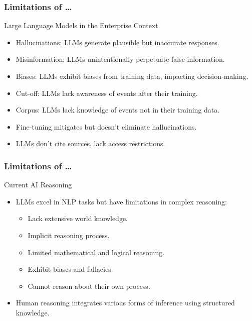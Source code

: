 


\begin{frame}[fragile]\frametitle{Limitations of \ldots}
Large Language Models in the Enterprise Context

\begin{itemize}
\item Hallucinations: LLMs generate plausible but inaccurate responses.
\item Misinformation: LLMs unintentionally perpetuate false information.
\item Biases: LLMs exhibit biases from training data, impacting decision-making.
\item Cut-off: LLMs lack awareness of events after their training.
\item Corpus: LLMs lack knowledge of events not in their training data.
\item Fine-tuning mitigates but doesn't eliminate hallucinations.
\item LLMs don't cite sources, lack access restrictions.
\end{itemize}	

\end{frame}

\begin{frame}[fragile]\frametitle{Limitations of \ldots}
Current AI Reasoning
    \begin{itemize}
        \item LLMs excel in NLP tasks but have limitations in complex reasoning:
        \begin{itemize}
            \item Lack extensive world knowledge.
            \item Implicit reasoning process.
            \item Limited mathematical and logical reasoning.
            \item Exhibit biases and fallacies.
            \item Cannot reason about their own process.
        \end{itemize}
        \item Human reasoning integrates various forms of inference using structured knowledge.
    \end{itemize}
\end{frame}


